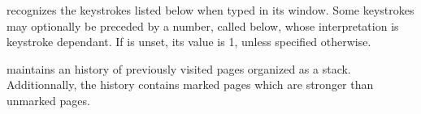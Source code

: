 
{\ActiveDVI} recognizes the keystrokes listed below when typed in its window.
Some keystrokes may optionally be preceded by a number, called \arg
below, whose interpretation is keystroke dependant. If \arg is unset,
its value is 1, unless specified otherwise.

{\ActiveDVI} maintains an history of previously visited pages
organized as a stack.
Additionnally, the history contains marked pages which are stronger than
unmarked pages. 

\Stretch\newpage\Stretch
